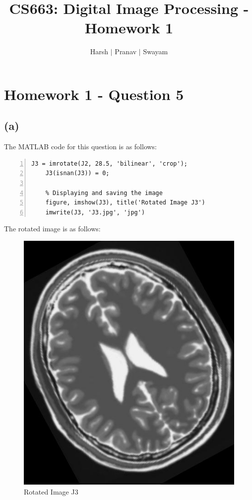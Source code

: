 \documentclass{article}
\title{CS663: Digital Image Processing - Homework 1}
\author{Harsh $\vert$ Pranav $\vert$ Swayam}
\begin{document}
\maketitle
\section{Homework 1 - Question 5}

\subsection*{(a)}

The MATLAB code for this question is as follows:
\begin{lstlisting}[frame=single,numbers=left,style=Matlab-Pyglike]    
    J3 = imrotate(J2, 28.5, 'bilinear', 'crop');
    J3(isnan(J3)) = 0;

    % Displaying and saving the image
    figure, imshow(J3), title('Rotated Image J3')
    imwrite(J3, 'J3.jpg', 'jpg')
\end{lstlisting}

The rotated image is as follows:
\begin{figure}[H]
\centering
\includegraphics[scale=0.3]{J3.jpg}
\caption{Rotated Image J3}
\end{figure}
\end{document}
